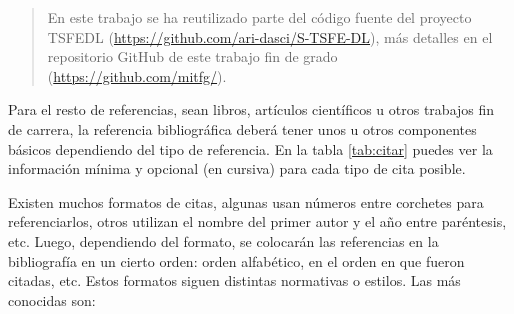 \begin{quote}
\begin{it}
    En este trabajo se ha reutilizado parte del código fuente del proyecto TSFEDL (\url{https://github.com/ari-dasci/S-TSFE-DL}), más detalles en el repositorio GitHub de este trabajo fin de grado (\url{https://github.com/mitfg/}).
\end{it}
\end{quote}

Para el resto de referencias, sean libros, artículos científicos u otros trabajos fin de carrera, la referencia bibliográfica deberá tener unos u otros componentes básicos dependiendo del tipo de referencia. En la tabla \ref{tab:citar} puedes ver la información mínima y opcional (en cursiva) para cada tipo de cita posible.
    
Existen muchos formatos de citas, algunas usan números entre corchetes para referenciarlos, otros utilizan el nombre del primer autor y el año entre paréntesis, etc. Luego, dependiendo del formato, se colocarán las referencias en la bibliografía en un cierto orden: orden alfabético, en el orden en que fueron citadas, etc. Estos formatos siguen distintas normativas o estilos. Las más conocidas son:

